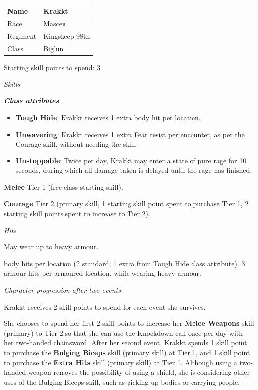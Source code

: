 \begin{table}
\begin{tabular}{|l|l|} \hline 
Name & Krakkt \\
 \hline Race & Mascen \\
 \hline Regiment & Kingskeep 98th \\
 \hline Class & Big'un \\
 \hline \end{tabular}

\end{table}

Starting skill points to spend: 3

\textit{Skills}

\textbf{\textit{Class attributes}}

\begin{itemize}
\item \textbf{Tough Hide}: Krakkt receives 1 extra body hit per location.

\item \textbf{Unwavering}: Krakkt receives 1 extra Fear resist per encounter, as per the Courage skill, without needing the skill.

\item \textbf{Unstoppable}: Twice per day, Krakkt may enter a state of pure rage for 10 seconds, during which all damage taken is delayed until the rage has finished.

\end{itemize}
\textbf{Melee} Tier 1 (free class starting skill).

\textbf{Courage} Tier 2 (primary skill, 1 starting skill point spent to purchase Tier 1, 2 starting skill points spent to increase to Tier 2).

\textit{Hits}

May wear up to heavy armour.

body hits per location (2 standard, 1 extra from Tough Hide class attribute). 3 armour hits per armoured location, while wearing heavy armour.

\textit{Character progression after two events}

Krakkt receives 2 skill points to spend for each event she survives.

She chooses to spend her first 2 skill points to increase her \textbf{Melee Weapons} skill (primary) to Tier 2 so that she can use the Knockdown call once per day with her two-handed chainsword. After her second event, Krakkt spends 1 skill point to purchase the \textbf{Bulging Biceps} skill (primary skill) at Tier 1, and 1 skill point to purchase the \textbf{Extra Hits} skill (primary skill) at Tier 1. Although using a two-handed weapon removes the possibility of using a shield, she is considering other uses of the Bulging Biceps skill, such as picking up bodies or carrying people.

